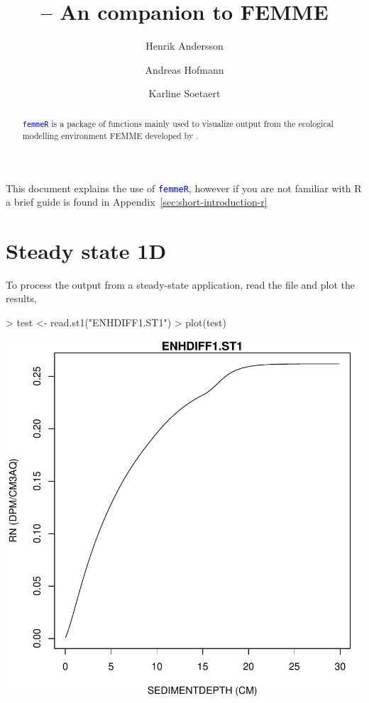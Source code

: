 \documentclass{scrartcl}
\title{\Rcode{femmeR} -- An \R{} companion to FEMME}
\author{Henrik Andersson \and Andreas Hofmann \and Karline Soetaert}
\newcommand{\Rcode}[1]{\texttt{\textcolor{blue}{#1}}}
\newcommand{\R}{\textsf{R}}
\begin{document}
 
\maketitle
\setcounter{tocdepth}{1}

\begin{abstract}
  \Rcode{femmeR} is a package of functions mainly used to visualize
  output from the ecological modelling environment FEMME developed by
  \citet{soetaert00b}.
\end{abstract}


\tableofcontents
{}

\newpage

\noindent \textsf{This document explains the use of \Rcode{femmeR}, however if
  you are not familiar with \R{} a brief guide is found in Appendix~\ref{sec:short-introduction-r}}

\section{Steady state 1D}

To process the output from a steady-state application, read the file
and plot the results, 


\begin{Schunk}
\begin{Sinput}
> test <- read.st1("ENHDIFF1.ST1")
> plot(test)
\end{Sinput}
\end{Schunk}
\includegraphics{figures/f-002}
\end{document}
